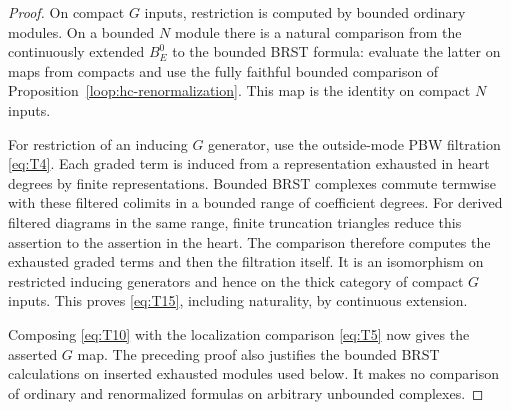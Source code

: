 \begin{proof}
On compact $G$ inputs, restriction is computed by bounded ordinary
modules.  On a bounded $N$ module there is a natural comparison from
the continuously extended $B_E^0$ to the bounded BRST formula:
evaluate the latter on maps from compacts and use the fully faithful
bounded comparison of
Proposition~\ref{loop:hc-renormalization}.  This map is the identity on
compact $N$ inputs.

For restriction of an inducing $G$ generator, use the outside-mode
PBW filtration \eqref{eq:T4}.  Each graded term is induced from a
representation exhausted in heart degrees by finite representations.
Bounded BRST complexes commute termwise with these filtered colimits
in a bounded range of coefficient degrees.  For derived filtered
diagrams in the same range, finite truncation triangles reduce this
assertion to the assertion in the heart.  The comparison therefore
computes the exhausted graded terms and then the filtration itself.
It is an isomorphism on restricted inducing generators and hence on
the thick category of compact $G$ inputs.  This proves
\eqref{eq:T15}, including naturality, by continuous extension.

Composing \eqref{eq:T10} with the localization comparison
\eqref{eq:T5} now gives the asserted $G$ map.  The preceding proof
also justifies the bounded BRST calculations on inserted exhausted
modules used below.  It makes no comparison of ordinary and
renormalized formulas on arbitrary unbounded complexes.
\end{proof}
